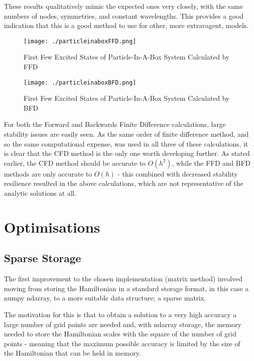 These results qualitatively mimic the expected ones very closely, with the same numbers of nodes, symmetries, and constant wavelengths. This provides a good indication that this is a good method to use for other, more extravagent, models.

\begin{figure}[H]
	\texttt{[image: ./particleinaboxFFD.png]}
	\centering
	\caption{First Few Excited States of Particle-In-A-Box System Calculated by FFD}
\end{figure}

\begin{figure}[H]
	\texttt{[image: ./particleinaboxBFD.png]}
	\centering
	\caption{First Few Excited States of Particle-In-A-Box System Calculated by BFD}
\end{figure}

For both the Forward and Backwards Finite Difference calculations, large stability issues are easily seen. As the same order of finite difference method, and so the same computational expense, was used in all three of these calculations, it is clear that the CFD method is the only one worth developing further. As stated earlier, the CFD method should be accurate to $O(h^{2})$, while the FFD and BFD methods are only accurate to $O(h)$ - this combined with decreased stability resilience resulted in the above calculations, which are not representative of the analytic solutions at all.

\section{Optimisations}

\subsection{Sparse Storage}
The first improvement to the chosen implementation (matrix method) involved moving from storing the Hamiltonian in a standard storage format, in this case a numpy ndarray, to a more suitable data structure; a sparse matrix. 

The motivation for this is that to obtain a solution to a very high accuracy a large number of grid points are needed and, with ndarray storage, the memory needed to store the Hamiltonian scales with the square of the number of grid points - meaning that the maximum possible accuracy is limited by the size of the Hamiltonian that can be held in memory. 


